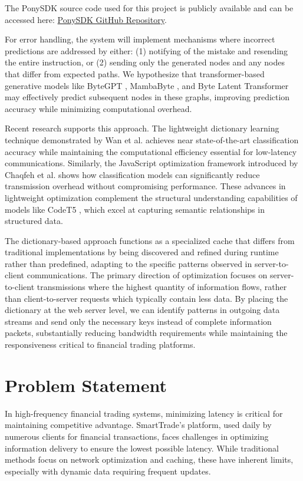 \documentclass[a4paper, 11pt, twoside, openright]{report}
\begin{document}
The PonySDK source code used for this project is publicly available and can be accessed here: \href{https://github.com/smartTrade-OpenSource/PonySDK}{PonySDK GitHub Repository}.
\bigskip

\noindent
For error handling, the system will implement mechanisms where incorrect predictions are addressed by either: (1) notifying of the mistake and resending the entire instruction, or (2) sending only the generated nodes and any nodes that differ from expected paths. We hypothesize that transformer-based generative models like ByteGPT \cite{ByteGPT2024}, MambaByte \cite{MambaByte2024}, and Byte Latent Transformer \cite{ByteLatentTransformer2024} may effectively predict subsequent nodes in these graphs, improving prediction accuracy while minimizing computational overhead.
\bigskip

\noindent
Recent research supports this approach. The lightweight dictionary learning technique demonstrated by Wan et al. \cite{LZWDict2024} achieves near state-of-the-art classification accuracy while maintaining the computational efficiency essential for low-latency communications. Similarly, the JavaScript optimization framework introduced by Chaqfeh et al. \cite{JSAccel2023} shows how classification models can significantly reduce transmission overhead without compromising performance. These advances in lightweight optimization complement the structural understanding capabilities of models like CodeT5 \cite{CodeT5_2021}, which excel at capturing semantic relationships in structured data.

The dictionary-based approach functions as a specialized cache that differs from traditional implementations by being discovered and refined during runtime rather than predefined, adapting to the specific patterns observed in server-to-client communications. The primary direction of optimization focuses on server-to-client transmissions where the highest quantity of information flows, rather than client-to-server requests which typically contain less data. By placing the dictionary at the web server level, we can identify patterns in outgoing data streams and send only the necessary keys instead of complete information packets, substantially reducing bandwidth requirements while maintaining the responsiveness critical to financial trading platforms.


\chapter{Problem Statement}
In high-frequency financial trading systems, minimizing latency is critical for maintaining competitive advantage. SmartTrade's platform, used daily by numerous clients for financial transactions, faces challenges in optimizing information delivery to ensure the lowest possible latency. While traditional methods focus on network optimization and caching, these have inherent limits, especially with dynamic data requiring frequent updates.
\end{document}
